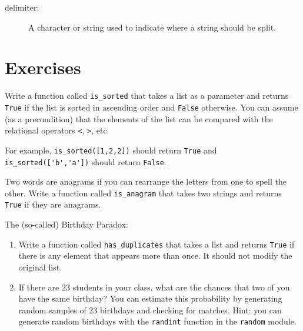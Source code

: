 \documentclass[10pt]{book}
\begin{document}
\begin{CJK}{UTF8}{gbsn}
\begin{description}
\item[delimiter:] A character or string used to indicate where a
string should be split.

\end{description}


\section{Exercises}

\begin{exercise}
Write a function called \verb"is_sorted" that takes a list as a
parameter and returns {\tt True} if the list is sorted in ascending
order and {\tt False} otherwise.  You can assume (as a precondition)
that the elements of the list can be compared with the relational
operators {\tt <}, {\tt >}, etc.

For example, \verb"is_sorted([1,2,2])" should return {\tt True}
and \verb"is_sorted(['b','a'])" should return {\tt False}.
\end{exercise}


\begin{exercise}
\label{anagram}

Two words are anagrams if you can rearrange the letters from one
to spell the other.  Write a function called \verb"is_anagram"
that takes two strings and returns {\tt True} if they are anagrams.
\end{exercise}


\begin{exercise}
\label{duplicate}

The (so-called) Birthday Paradox:

\begin{enumerate}

\item Write a function called \verb"has_duplicates" that takes
a list and returns {\tt True} if there is any element that
appears more than once.  It should not modify the original
list.

\item If there are 23 students in your class, what are the chances
that two of you have the same birthday?  You can estimate this
probability by generating random samples of 23 birthdays
and checking for matches.  Hint: you can generate random birthdays
with the {\tt randint} function in the {\tt random} module.


\end{enumerate}
\end{exercise}
\end{CJK}
\end{document}
